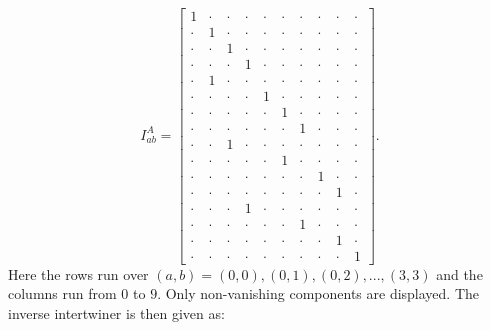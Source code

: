 \begin{equation}\label{interIMet}
I^A_{ab} = \begin{bmatrix}
                1 & \cdot & \cdot & \cdot & \cdot & \cdot & \cdot & \cdot & \cdot & \cdot \\
                \cdot & 1 & \cdot & \cdot & \cdot & \cdot & \cdot & \cdot & \cdot & \cdot \\
                \cdot & \cdot & 1 & \cdot & \cdot & \cdot & \cdot & \cdot & \cdot & \cdot \\
                \cdot & \cdot & \cdot & 1 & \cdot & \cdot & \cdot & \cdot & \cdot & \cdot \\
                \cdot & 1 & \cdot & \cdot & \cdot & \cdot & \cdot & \cdot & \cdot & \cdot \\
                \cdot & \cdot & \cdot & \cdot & 1 & \cdot & \cdot & \cdot & \cdot & \cdot \\
                \cdot & \cdot & \cdot & \cdot & \cdot & 1 & \cdot & \cdot & \cdot & \cdot \\
                \cdot & \cdot & \cdot & \cdot & \cdot & \cdot & 1 & \cdot & \cdot & \cdot \\
                \cdot & \cdot & 1 & \cdot & \cdot & \cdot & \cdot & \cdot & \cdot & \cdot  \\
                \cdot & \cdot & \cdot & \cdot & \cdot & 1 & \cdot & \cdot & \cdot & \cdot  \\
                \cdot & \cdot & \cdot & \cdot & \cdot & \cdot & \cdot & 1 & \cdot & \cdot\\
                \cdot & \cdot & \cdot & \cdot & \cdot & \cdot & \cdot & \cdot & 1 & \cdot \\
                \cdot & \cdot & \cdot & 1 & \cdot & \cdot & \cdot & \cdot & \cdot & \cdot \\
                \cdot & \cdot & \cdot & \cdot & \cdot & \cdot & 1 & \cdot & \cdot & \cdot \\
                \cdot & \cdot & \cdot & \cdot & \cdot & \cdot & \cdot & \cdot & 1 & \cdot \\
                \cdot & \cdot & \cdot & \cdot & \cdot & \cdot & \cdot & \cdot & \cdot & 1 
            \end{bmatrix}.
\end{equation}
Here the rows run over $(a,b)={(0,0),(0,1),(0,2),...,(3,3)}$ and the columns run from $0$ to $9$. Only non-vanishing components are displayed. The inverse intertwiner is then given as: 

